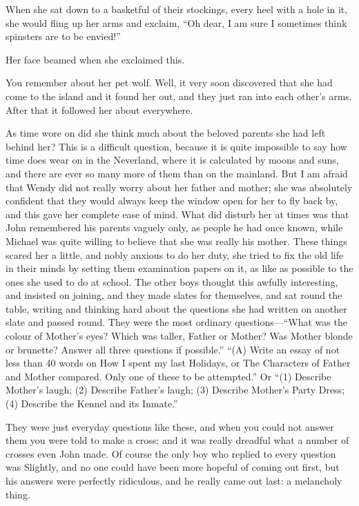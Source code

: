 When she sat down to a basketful of their stockings, every heel with a
hole in it, she would fling up her arms and exclaim, ``Oh dear, I am
sure I sometimes think spinsters are to be envied!''

Her face beamed when she exclaimed this.

You remember about her pet wolf. Well, it very soon discovered that she
had come to the island and it found her out, and they just ran into
each other's arms. After that it followed her about everywhere.

As time wore on did she think much about the beloved parents she had
left behind her? This is a difficult question, because it is quite
impossible to say how time does wear on in the Neverland, where it is
calculated by moons and suns, and there are ever so many more of them
than on the mainland. But I am afraid that Wendy did not really worry
about her father and mother; she was absolutely confident that they
would always keep the window open for her to fly back by, and this gave
her complete ease of mind. What did disturb her at times was that John
remembered his parents vaguely only, as people he had once known, while
Michael was quite willing to believe that she was really his mother.
These things scared her a little, and nobly anxious to do her duty, she
tried to fix the old life in their minds by setting them examination
papers on it, as like as possible to the ones she used to do at school.
The other boys thought this awfully interesting, and insisted on
joining, and they made slates for themselves, and sat round the table,
writing and thinking hard about the questions she had written on
another slate and passed round. They were the most ordinary
questions—``What was the colour of Mother's eyes? Which was taller,
Father or Mother? Was Mother blonde or brunette? Answer all three
questions if possible.'' ``(A) Write an essay of not less than 40 words
on How I spent my last Holidays, or The Characters of Father and Mother
compared. Only one of these to be attempted.'' Or ``(1) Describe Mother's
laugh; (2) Describe Father's laugh; (3) Describe Mother's Party Dress;
(4) Describe the Kennel and its Inmate.''

They were just everyday questions like these, and when you could not
answer them you were told to make a cross; and it was really dreadful
what a number of crosses even John made. Of course the only boy who
replied to every question was Slightly, and no one could have been more
hopeful of coming out first, but his answers were perfectly ridiculous,
and he really came out last: a melancholy thing.

